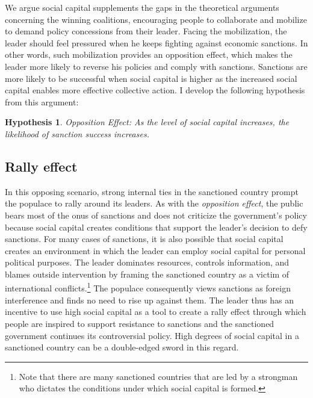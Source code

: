 \documentclass[
  english,
  man]{apa6}
\newtheorem{hyp}{Hypothesis}
\begin{document}
We argue social capital supplements the gaps in the theoretical arguments concerning the winning coalitions, encouraging people to collaborate and mobilize to demand policy concessions from their leader. Facing the mobilization, the leader should feel pressured when he keeps fighting against economic sanctions. In other words, such mobilization provides an opposition effect, which makes the leader more likely to reverse his policies and comply with sanctions. Sanctions are more likely to be successful when social capital is higher as the increased social capital enables more effective collective action. I develop the following hypothesis from this argument:
\newline

\begin{hyp}\label{opposition} Opposition Effect: As the level of social capital increases, the likelihood of sanction success increases.\end{hyp}

\hypertarget{rally-effect}{%
\subsection{Rally effect}\label{rally-effect}}

In this opposing scenario, strong internal ties in the sanctioned country prompt the populace to rally around its leaders. As with the \emph{opposition effect}, the public bears most of the onus of sanctions and does not criticize the government's policy because social capital creates conditions that support the leader's decision to defy sanctions. For many cases of sanctions, it is also possible that social capital creates an environment in which the leader can employ social capital for personal political purposes. The leader dominates resources, controls information, and blames outside intervention by framing the sanctioned country as a victim of international conflicts.\footnote{Note that there are many sanctioned countries that are led by a strongman who dictates the conditions under which social capital is formed.} The populace consequently views sanctions as foreign interference and finds no need to rise up against them. The leader thus has an incentive to use high social capital as a tool to create a rally effect through which people are inspired to support resistance to sanctions and the sanctioned government continues its controversial policy. High degrees of social capital in a sanctioned country can be a double-edged sword in this regard.
\end{document}
